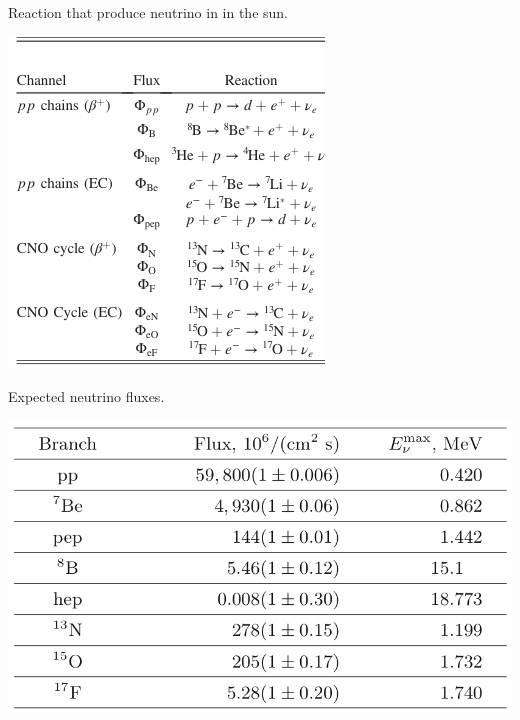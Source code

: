 \noindent
\begin{minipage}[t]{0.45\textwidth}
\begin{table}[H]
	\centering
	\captionsetup{width=\textwidth}
	\caption{Reaction that produce neutrino in in the sun.}
	\includegraphics[width=\textwidth]{assets/ReactionProd.png}
	\label{table:RNeu}
\end{table}
\end{minipage}\hfill
\begin{minipage}[t]{0.45\textwidth}
	\begin{table}[H]
	\centering
	\captionsetup{width=\textwidth}
	\caption{Expected neutrino fluxes.}
	\includegraphics[width=\textwidth]{assets/SSMexpect.png}
	\label{table:SSMflux}
\end{table}
\end{minipage}

